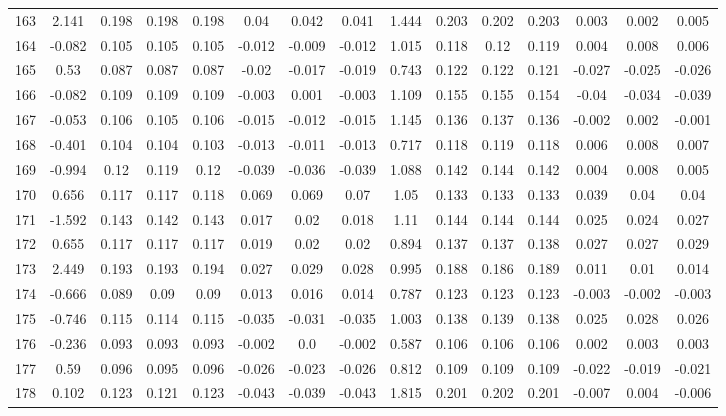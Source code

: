 \begin{table}[H]
{\begin{tabular}{l|c|ccc|ccc|c|ccc|ccc}
			163 & 2.141 & 0.198 & 0.198 & 0.198 & 0.04 & 0.042 & 0.041 & 1.444 & 0.203 & 0.202 & 0.203 & 0.003 & 0.002 & 0.005 \\
			164 & -0.082 & 0.105 & 0.105 & 0.105 & -0.012 & -0.009 & -0.012 & 1.015 & 0.118 & 0.12 & 0.119 & 0.004 & 0.008 & 0.006 \\
			165 & 0.53 & 0.087 & 0.087 & 0.087 & -0.02 & -0.017 & -0.019 & 0.743 & 0.122 & 0.122 & 0.121 & -0.027 & -0.025 & -0.026 \\
			166 & -0.082 & 0.109 & 0.109 & 0.109 & -0.003 & 0.001 & -0.003 & 1.109 & 0.155 & 0.155 & 0.154 & -0.04 & -0.034 & -0.039 \\
			167 & -0.053 & 0.106 & 0.105 & 0.106 & -0.015 & -0.012 & -0.015 & 1.145 & 0.136 & 0.137 & 0.136 & -0.002 & 0.002 & -0.001 \\
			168 & -0.401 & 0.104 & 0.104 & 0.103 & -0.013 & -0.011 & -0.013 & 0.717 & 0.118 & 0.119 & 0.118 & 0.006 & 0.008 & 0.007 \\
			169 & -0.994 & 0.12 & 0.119 & 0.12 & -0.039 & -0.036 & -0.039 & 1.088 & 0.142 & 0.144 & 0.142 & 0.004 & 0.008 & 0.005 \\
			170 & 0.656 & 0.117 & 0.117 & 0.118 & 0.069 & 0.069 & 0.07 & 1.05 & 0.133 & 0.133 & 0.133 & 0.039 & 0.04 & 0.04 \\
			171 & -1.592 & 0.143 & 0.142 & 0.143 & 0.017 & 0.02 & 0.018 & 1.11 & 0.144 & 0.144 & 0.144 & 0.025 & 0.024 & 0.027 \\
			172 & 0.655 & 0.117 & 0.117 & 0.117 & 0.019 & 0.02 & 0.02 & 0.894 & 0.137 & 0.137 & 0.138 & 0.027 & 0.027 & 0.029 \\
			173 & 2.449 & 0.193 & 0.193 & 0.194 & 0.027 & 0.029 & 0.028 & 0.995 & 0.188 & 0.186 & 0.189 & 0.011 & 0.01 & 0.014 \\
			174 & -0.666 & 0.089 & 0.09 & 0.09 & 0.013 & 0.016 & 0.014 & 0.787 & 0.123 & 0.123 & 0.123 & -0.003 & -0.002 & -0.003 \\
			175 & -0.746 & 0.115 & 0.114 & 0.115 & -0.035 & -0.031 & -0.035 & 1.003 & 0.138 & 0.139 & 0.138 & 0.025 & 0.028 & 0.026 \\
			176 & -0.236 & 0.093 & 0.093 & 0.093 & -0.002 & 0.0 & -0.002 & 0.587 & 0.106 & 0.106 & 0.106 & 0.002 & 0.003 & 0.003 \\
			177 & 0.59 & 0.096 & 0.095 & 0.096 & -0.026 & -0.023 & -0.026 & 0.812 & 0.109 & 0.109 & 0.109 & -0.022 & -0.019 & -0.021 \\
			178 & 0.102 & 0.123 & 0.121 & 0.123 & -0.043 & -0.039 & -0.043 & 1.815 & 0.201 & 0.202 & 0.201 & -0.007 & 0.004 & -0.006 \\

\end{tabular}}
\end{table}
